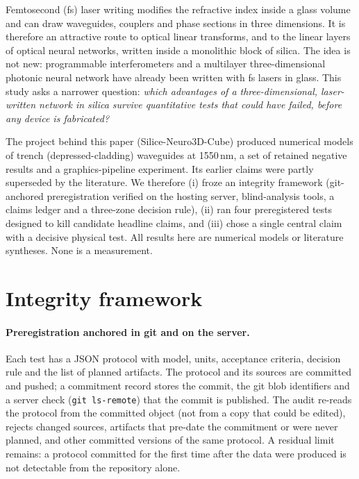 \documentclass[10pt,a4paper]{article}
\begin{document}
Femtosecond (fs) laser writing modifies the refractive index inside a glass volume and can draw waveguides, couplers and phase sections in three dimensions. It is therefore an attractive route to optical linear transforms, and to the linear layers of optical neural networks, written inside a monolithic block of silica. The idea is not new: programmable interferometers \cite{Kondratyev2024,Pentangelo2024} and a multilayer three-dimensional photonic neural network \cite{Cao2026} have already been written with fs lasers in glass. This study asks a narrower question: \emph{which advantages of a three-dimensional, laser-written network in silica survive quantitative tests that could have failed, before any device is fabricated?}

The project behind this paper (Silice-Neuro3D-Cube) produced numerical models of trench (depressed-cladding) waveguides at 1550\,nm, a set of retained negative results and a graphics-pipeline experiment. Its earlier claims were partly superseded by the literature. We therefore (i) froze an integrity framework (git-anchored preregistration verified on the hosting server, blind-analysis tools, a claims ledger and a three-zone decision rule), (ii) ran four preregistered tests designed to kill candidate headline claims, and (iii) chose a single central claim with a decisive physical test. All results here are numerical models or literature syntheses. None is a measurement.

\section{Integrity framework}

\paragraph{Preregistration anchored in git and on the server.} Each test has a JSON protocol with model, units, acceptance criteria, decision rule and the list of planned artifacts. The protocol and its sources are committed and pushed; a commitment record stores the commit, the git blob identifiers and a server check (\texttt{git ls-remote}) that the commit is published. The audit re-reads the protocol from the committed object (not from a copy that could be edited), rejects changed sources, artifacts that pre-date the commitment or were never planned, and other committed versions of the same protocol. A residual limit remains: a protocol committed for the first time after the data were produced is not detectable from the repository alone.
\end{document}
